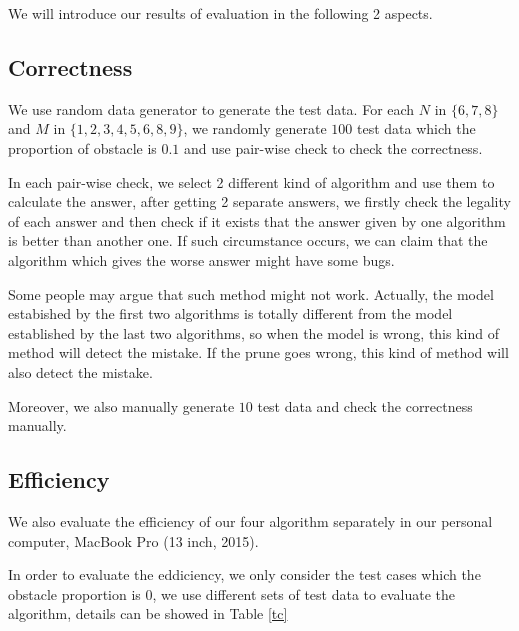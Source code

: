 \documentclass[twocolumn]{article}
\begin{document}
We will introduce our results of evaluation in the following 2 aspects.

\subsection{Correctness}

We use random data generator to generate the test data. For each $N$ in $\{6, 7, 8\}$ and $M$ in $\{1, 2, 3, 4, 5, 6, 8, 9\}$, we randomly generate $100$ test data which the proportion of obstacle is $0.1$ and use pair-wise check to check the correctness.

In each pair-wise check, we select 2 different kind of algorithm and use them to calculate the answer, after getting 2 separate answers, we firstly check the legality of each answer and then check if it exists that the answer given by one algorithm is better than another one. If such circumstance occurs, we can claim that the algorithm which gives the worse answer might have some bugs.

Some people may argue that such method might not work. Actually, the model estabished by the first two algorithms is totally different from the model established by the last two algorithms, so when the model is wrong, this kind of method will detect the mistake. If the prune goes wrong, this kind of method will also detect the mistake. 

Moreover, we also manually generate $10$ test data and check the correctness manually.

\subsection{Efficiency}

We also evaluate the efficiency of our four algorithm separately in our personal computer, MacBook Pro (13 inch, 2015).

In order to evaluate the eddiciency, we only consider the test cases which the obstacle proportion is $0$, we use different sets of test data to evaluate the algorithm, details can be showed in Table \ref{tc}
\end{document}
